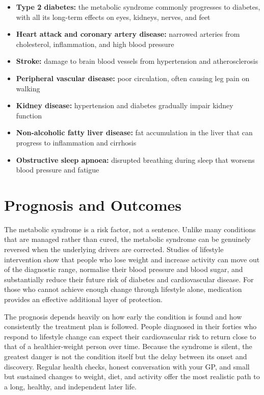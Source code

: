 \begin{itemize}
    \item \textbf{Type 2 diabetes:} the metabolic syndrome commonly progresses to diabetes, with all its long-term effects on eyes, kidneys, nerves, and feet
    \item \textbf{Heart attack and coronary artery disease:} narrowed arteries from cholesterol, inflammation, and high blood pressure
    \item \textbf{Stroke:} damage to brain blood vessels from hypertension and atherosclerosis
    \item \textbf{Peripheral vascular disease:} poor circulation, often causing leg pain on walking
    \item \textbf{Kidney disease:} hypertension and diabetes gradually impair kidney function
    \item \textbf{Non-alcoholic fatty liver disease:} fat accumulation in the liver that can progress to inflammation and cirrhosis
    \item \textbf{Obstructive sleep apnoea:} disrupted breathing during sleep that worsens blood pressure and fatigue
\end{itemize}

\section*{Prognosis and Outcomes}
The metabolic syndrome is a risk factor, not a sentence. Unlike many conditions that are managed rather than cured, the metabolic syndrome can be genuinely reversed when the underlying drivers are corrected. Studies of lifestyle intervention show that people who lose weight and increase activity can move out of the diagnostic range, normalise their blood pressure and blood sugar, and substantially reduce their future risk of diabetes and cardiovascular disease. For those who cannot achieve enough change through lifestyle alone, medication provides an effective additional layer of protection.

The prognosis depends heavily on how early the condition is found and how consistently the treatment plan is followed. People diagnosed in their forties who respond to lifestyle change can expect their cardiovascular risk to return close to that of a healthier-weight person over time. Because the syndrome is silent, the greatest danger is not the condition itself but the delay between its onset and discovery. Regular health checks, honest conversation with your GP, and small but sustained changes to weight, diet, and activity offer the most realistic path to a long, healthy, and independent later life.

